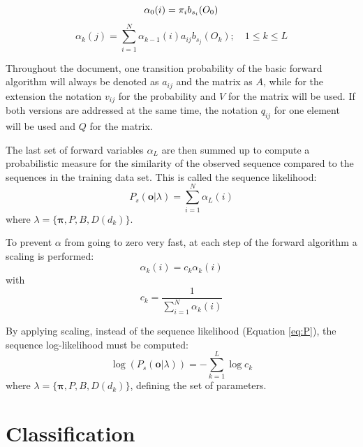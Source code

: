 \documentclass[mscthesis]{usiinfthesis}
\begin{document}
\begin{equation}
    \label{eq:forward_init_basic}
    \alpha_0(i) = \pi_{i}b_{s_i}(O_0) \\
\end{equation}
\begin{equation}
    \label{eq:forward_basic}
    \alpha_k(j) = \sum_{i=1}^{N} \alpha_{k-1}(i) a_{ij} b_{s_j}(O_k);
    \quad 1 \leq k \leq L
\end{equation}

Throughout the document, one transition probability of the basic forward
algorithm will always be denoted as $a_{ij}$ and the matrix as $A$, while for
the extension the notation $v_{ij}$ for the probability and $V$ for the matrix
will be used. If both versions are addressed at the same time, the notation
$q_{ij}$ for one element will be used and $Q$ for the matrix.

The last set of forward variables $ \alpha_L $ are then summed up to compute
a probabilistic measure for the similarity of the observed sequence compared to
the sequences in the training data set. This is called the sequence likelihood:
\begin{equation}
    \label{eq:P}
    P_s(\boldsymbol{o}|\lambda) = \sum\limits_{i=1}^{N} \alpha_L(i)
\end{equation}
where $ \lambda = \{\boldsymbol{\pi}, P, B, D(d_k) \} $.

To prevent $ \alpha $ from going to zero very fast, at each step of the forward
algorithm a scaling is performed:
\begin{equation}
    \label{eq:scaled}
    \alpha_k(i) = c_k \alpha_k(i)
\end{equation}
with
\begin{equation}
    \label{eq:scaling_factor}
    c_k = \frac{1}{\sum\limits_{i=1}^{N} \alpha_k(i)}
\end{equation}

By applying scaling, instead of the sequence likelihood (Equation \ref{eq:P}),
the sequence log-likelihood must be computed:
\begin{equation}
    \label{eq:Plog}
    \log(P_s(\boldsymbol{o}|\lambda)) = -\sum\limits_{k=1}^{L} \log c_k
\end{equation}
where $ \lambda = \{\boldsymbol{\pi}, P, B, D(d_k) \} $, defining the set of
parameters.

\section{Classification}
\label{ch:event_class}
\end{document}
